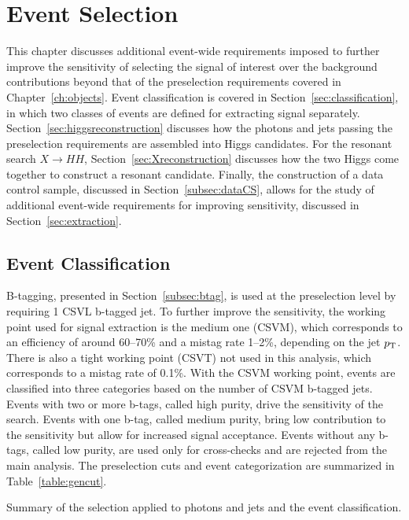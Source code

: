 \chapter{Event Selection\label{ch:selection}}

This chapter discusses additional event-wide requirements imposed to further
improve the sensitivity of selecting the signal of interest over the background contributions
beyond that of the preselection requirements covered in Chapter~\ref{ch:objects}.
Event classification is covered in Section~\ref{sec:classification}, in which two classes of
events are defined for extracting signal separately.
Section~\ref{sec:higgsreconstruction} discusses how the photons and jets passing the preselection
requirements are assembled into Higgs candidates. For the resonant search $X\rightarrow HH$,
Section~\ref{sec:Xreconstruction} discusses how the two Higgs come together to construct a resonant
candidate. Finally, the construction of a data control
sample, discussed in Section~\ref{subsec:dataCS}, allows for the study of additional event-wide
requirements for improving sensitivity, discussed in Section~\ref{sec:extraction}.

\section{Event Classification\label{sec:classification}}

B-tagging, presented in Section~\ref{subsec:btag}, is used at the preselection level by
requiring 1 CSVL b-tagged jet. To further improve the sensitivity, the working point used for
signal extraction is the medium one (CSVM), which corresponds to an efficiency of around 60--70\%
and a mistag rate 1--2\%, depending on the jet $p_{\rm T}$.
There is also a tight working point (CSVT) not used in this analysis,
which corresponds to a mistag rate of 0.1\%.
With the CSVM working point, events are classified into three categories
based on the number of CSVM b-tagged jets. Events with two or more b-tags, called high purity,
drive the sensitivity of the search. Events with one b-tag, called medium purity,
bring low contribution to the sensitivity
but allow for increased signal acceptance. Events without any b-tags,
called low purity, are used only for cross-checks and are rejected from the main analysis.
The preselection cuts and event categorization
are summarized in Table~\ref{table:gencut}.

\begin{table}[ht]
  \centering
  \renewcommand{\arraystretch}{1.4}
  \caption{Summary of the selection applied to photons and jets and the event classification.}
  
  \label{table:gencut}
\end{table}

